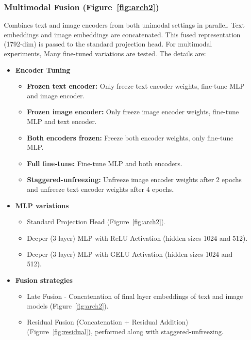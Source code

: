 \subsubsection*{Multimodal Fusion (Figure~\ref{fig:arch2})}
Combines text and image encoders from both unimodal settings in parallel. Text embeddings and image embeddings are concatenated. This fused representation (1792-dim) is passed to the standard projection head. For multimodal experiments, Many fine-tuned variations are tested. The details are:

\begin{itemize}
\item  \textbf{Encoder Tuning}
\begin{itemize}
    \item \textbf{Frozen text encoder:} Only freeze text encoder weights, fine-tune MLP and image encoder.
    \item \textbf{Frozen image encoder:} Only freeze image encoder weights, fine-tune MLP and text encoder.
    \item \textbf{Both encoders frozen:} Freeze both encoder weights, only fine-tune MLP.
    \item \textbf{Full fine-tune:} Fine-tune MLP and both encoders.
    \item \textbf{Staggered-unfreezing:} Unfreeze image encoder weights after 2 epochs and unfreeze text encoder weights after 4 epochs. 
\end{itemize}


\item \textbf{MLP variations}
\begin{itemize}
    \item Standard Projection Head (Figure~\ref{fig:arch2}).
    \item Deeper (3-layer) MLP with ReLU Activation (hidden sizes 1024 and 512).
    \item Deeper (3-layer) MLP with GELU Activation (hidden sizes 1024 and 512).
\end{itemize}



\item \textbf{Fusion strategies}
\begin{itemize}
    \item Late Fusion - Concatenation of final layer embeddings of text and image models (Figure~\ref{fig:arch2}).
    \item Residual Fusion (Concatenation + Residual Addition) (Figure~\ref{fig:residual}), performed along with staggered-unfreezing.
\end{itemize}
\end{itemize}

